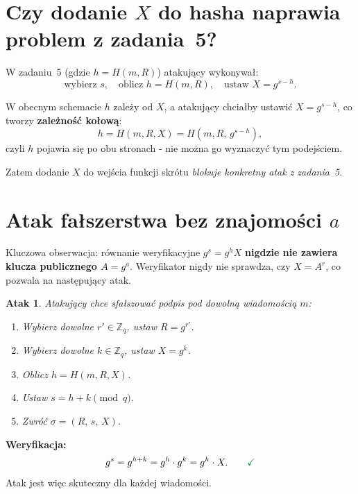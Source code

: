 \documentclass[12pt,a4paper]{article}
\newtheorem*{atak}{Atak}
\begin{document}
	\section{Czy dodanie $X$ do hasha naprawia problem z zadania~5?}
	
	W zadaniu~5 (gdzie $h = H(m, R)$) atakujący wykonywał:
	\[
	\text{wybierz } s, \quad \text{oblicz } h = H(m, R), \quad
	\text{ustaw } X = g^{s-h}.
	\]
	
	W obecnym schemacie $h$ zależy od $X$, a atakujący chciałby ustawić
	$X = g^{s-h}$, co tworzy \textbf{zależność kołową}:
	\[
	h = H(m, R, X) = H\!\left(m, R,\, g^{s - h}\right),
	\]
	czyli $h$ pojawia się po obu stronach - nie można go wyznaczyć
	tym podejściem.
	
	\medskip
	Zatem dodanie $X$ do wejścia funkcji skrótu \emph{blokuje konkretny atak
		z zadania~5}. 
	
	\section{Atak fałszerstwa bez znajomości $a$}
	
	Kluczowa obserwacja: równanie weryfikacyjne $g^s = g^h X$ \textbf{nigdzie
		nie zawiera klucza publicznego $A = g^a$}. Weryfikator nigdy nie sprawdza,
	czy $X = A^r$, co pozwala na następujący atak.
	
	\begin{atak}
		Atakujący chce sfałszować podpis pod dowolną wiadomością $m$:
		\begin{enumerate}[label=\arabic*.]
			\item Wybierz dowolne $r' \in \mathbb{Z}_q$, ustaw $R = g^{r'}$.
			\item Wybierz dowolne $k \in \mathbb{Z}_q$, ustaw $X = g^k$.
			\item Oblicz $h = H(m, R, X)$.
			\item Ustaw $s = h + k \pmod{q}$.
			\item Zwróć $\sigma = (R,\, s,\, X)$.
		\end{enumerate}
	\end{atak}
	
	\noindent\textbf{Weryfikacja:}
	\[
	g^s = g^{h+k} = g^h \cdot g^k = g^h \cdot X. \qquad {\color{correctgreen}\checkmark}
	\]
	Atak jest więc skuteczny dla każdej wiadomości.
	
\end{document}
